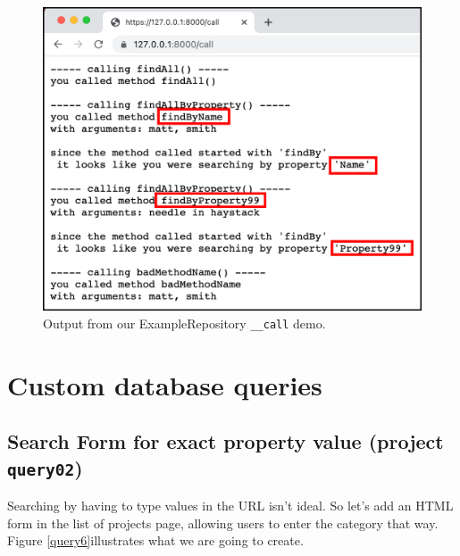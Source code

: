 \documentclass[a4paperpaper,openright]{book}
\begin{document}
\begin{figure}
\centering
\includegraphics{./tex2pdf.-8a1528da847c818a/1699517a0c019d4bb7db037b3892c1a224166067.png}
\caption{Output from our ExampleRepository \texttt{\_\_call} demo.
\label{query2}}
\end{figure}

\hypertarget{custom-database-queries-1}{%
\chapter{Custom database queries}\label{custom-database-queries-1}}

\hypertarget{search-form-for-exact-property-value-project-query02}{%
\section{\texorpdfstring{Search Form for exact property value (project
\texttt{query02})}{Search Form for exact property value (project query02)}}\label{search-form-for-exact-property-value-project-query02}}

Searching by having to type values in the URL isn't ideal. So let's add
an HTML form in the list of projects page, allowing users to enter the
category that way. Figure \ref{query6}illustrates what we are going to
create.
\end{document}
